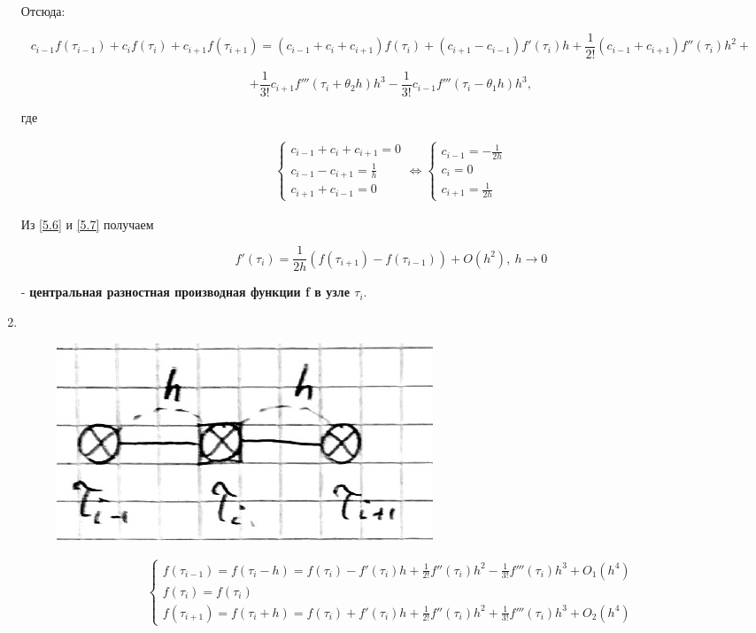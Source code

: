 \documentclass[__main__.tex]{subfiles}
\begin{document}
\begin{enumerate}
	Отсюда:
	
	$$
	c_{i-1} f\left( \tau_{i-1} \right) + c_i f\left( \tau_i \right) + c_{i+1} f \left( \tau_{i+1} \right) = \left( c_{i-1} + c_i + c_{i+1} \right) f \left( \tau_i \right) + \left( c_{i+1} - c_{i-1} \right) f'\left(\tau_i\right)h + \frac{1}{2!} \left(c_{i-1}+c_{i+1} \right) f''\left( \tau_i \right) h^2 +
	$$
	
	\begin{equation}\label{5.6}
	+ \frac{1}{3!} c_{i+1} f'''\left( \tau_i + \theta_2 h \right) h^3 - \frac{1}{3!}c_{i-1} f'''\left( \tau_i - \theta_1 h \right)h^3,
	\end{equation}
	
	где 
	
	\begin{gather}\label{5.7}
	\begin{cases}
	c_{i-1}+c_i+c_{i+1} = 0 \\
	c_{i-1} - c_{i+1} = \frac{1}{h}\\
	c_{i+1} + c_{i-1} = 0
	\end{cases}
	\Leftrightarrow
	\begin{cases}
	c_{i-1} = - \frac{1}{2h}\\
	c_i = 0 \\
	c_{i+1} = \frac{1}{2h}
	\end{cases}
	\end{gather}
	
	Из \ref{5.6} и \ref{5.7} получаем
	
	$$
	f'\left( \tau_i \right) = \frac{1}{2h} \left( f\left( \tau_{i+1} \right) - f \left( \tau_{i-1} \right) \right) + O \left(h^2\right), \ h\rightarrow 0
	$$
	
	 - \textbf{центральная разностная производная функции f в узле $\tau_i$}.
	 
	 \item $ $
	 
	 \begin{figure}[h!]
	 	\centering
	 	\includegraphics[width=0.3\linewidth]{img/img_5-5}
	 	\caption{}
	 	\label{img_5.5}
	 \end{figure}
	 
	 \begin{gather}
	 \begin{cases}
	 f\left( \tau_{i-1} \right) = f \left( \tau_i - h \right) = f \left( \tau_i \right) - f'\left(\tau_i\right)h + \frac{1}{2!} f''\left( \tau_i \right) h^2 - \frac{1}{3!} f'''\left( \tau_i \right) h^3 + O_1 \left(h^4\right)\\
	 f\left(\tau_i \right) = f\left(\tau_i \right) \\
	 f\left( \tau_{i+1} \right) = f \left( \tau_i + h \right) = f\left( \tau_i \right) + f'\left( \tau_i \right) h + \frac{1}{2!}f''\left( \tau_i \right) h^2 + \frac{1}{3!} f'''\left( \tau_i \right)h^3+ O_2 \left(h^4\right)
	 \end{cases}
	 \end{gather}
	

\end{enumerate}
\end{document}
